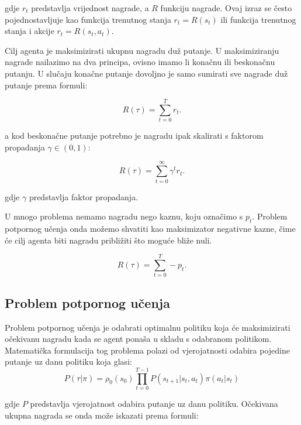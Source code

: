 \documentclass[times,utf8,diplomski]{fer}
\begin{document}
\noindent gdje ${r_t}$ predstavlja vrijednost nagrade, a ${R}$ funkciju nagrade. Ovaj izraz se često pojednostavljuje kao funkcija trenutnog stanja ${r_t = R(s_t)}$ ili funkcija trenutnog stanja i akcije ${r_t = R(s_t,a_t)}$.

Cilj agenta je maksimizirati ukupnu nagradu duž putanje. U maksimiziranju nagrade nailazimo na dva principa, ovisno imamo li konačnu ili beskonačnu putanju. U slučaju konačne putanje dovoljno je samo sumirati sve nagrade duž putanje prema formuli:

\begin{equation}
	\label{finite reward}
	R(\tau) = \sum_{t=0}^T r_t.
\end{equation}

\noindent a kod beskonačne putanje potrebno je nagradu ipak skalirati s faktorom propadanja ${\gamma \in (0,1)}$:

\begin{equation}
	\label{infinite reward}
	R(\tau) = \sum_{t=0}^{\infty} \gamma^t r_t.
\end{equation}

\noindent gdje ${\gamma}$ predstavlja faktor propadanja.

U mnogo problema nemamo nagradu nego kaznu, koju označimo s ${p_t}$. Problem potpornog učenja onda možemo shvatiti kao maksimizator negativne kazne, čime će cilj agenta biti nagradu približiti što moguće bliže nuli.

\begin{equation}
	\label{finite punishment}
	R(\tau) = \sum_{t=0}^T -p_t.
\end{equation}


\subsection{Problem potpornog učenja}

Problem potpornog učenja je odabrati optimalnu politiku koja će maksimizirati očekivanu nagradu kada se agent ponaša u skladu s odabranom politikom. Matematička formulacija tog problema polazi od vjerojatnosti odabira pojedine putanje uz danu politiku koja glasi:
\begin{equation}
	\label{probability trajectory}
	P(\tau|\pi) = \rho_0 (s_0) \prod_{t=0}^{T-1} P(s_{t+1} | s_t, a_t) \pi(a_t | s_t)
\end{equation}

\noindent gdje ${P}$ predstavlja vjerojatnost odabira putanje uz danu politiku. Očekivana ukupna nagrada se onda može iskazati prema formuli:
\end{document}
